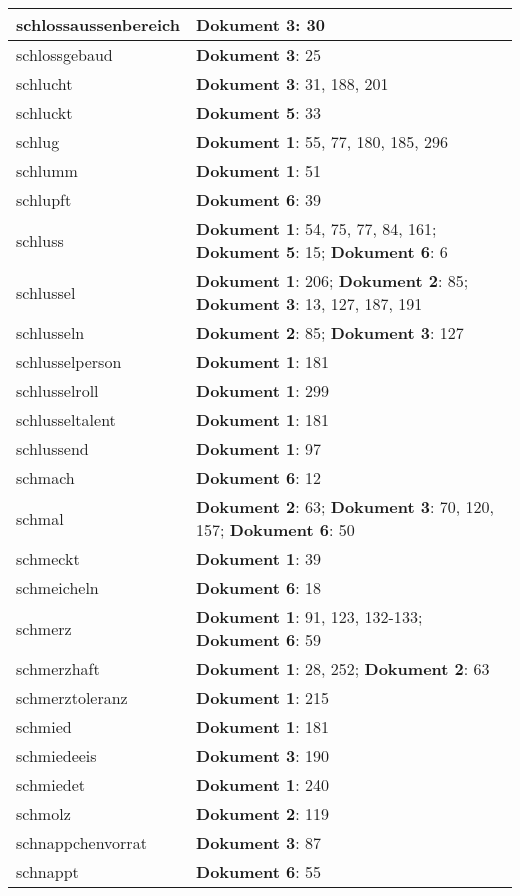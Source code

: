 \documentclass[a5paper]{article}
\begin{document}
\begin{longtable}[l]{|l|p{3in}|}
\hline
schlossaussenbereich & \textbf{Dokument 3}: 30 \\
\hline
schlossgebaud & \textbf{Dokument 3}: 25 \\
\hline
schlucht & \textbf{Dokument 3}: 31, 188, 201 \\
\hline
schluckt & \textbf{Dokument 5}: 33 \\
\hline
schlug & \textbf{Dokument 1}: 55, 77, 180, 185, 296 \\
\hline
schlumm & \textbf{Dokument 1}: 51 \\
\hline
schlupft & \textbf{Dokument 6}: 39 \\
\hline
schluss & \textbf{Dokument 1}: 54, 75, 77, 84, 161; \textbf{Dokument 5}: 15; \textbf{Dokument 6}: 6 \\
\hline
schlussel & \textbf{Dokument 1}: 206; \textbf{Dokument 2}: 85; \textbf{Dokument 3}: 13, 127, 187, 191 \\
\hline
schlusseln & \textbf{Dokument 2}: 85; \textbf{Dokument 3}: 127 \\
\hline
schlusselperson & \textbf{Dokument 1}: 181 \\
\hline
schlusselroll & \textbf{Dokument 1}: 299 \\
\hline
schlusseltalent & \textbf{Dokument 1}: 181 \\
\hline
schlussend & \textbf{Dokument 1}: 97 \\
\hline
schmach & \textbf{Dokument 6}: 12 \\
\hline
schmal & \textbf{Dokument 2}: 63; \textbf{Dokument 3}: 70, 120, 157; \textbf{Dokument 6}: 50 \\
\hline
schmeckt & \textbf{Dokument 1}: 39 \\
\hline
schmeicheln & \textbf{Dokument 6}: 18 \\
\hline
schmerz & \textbf{Dokument 1}: 91, 123, 132-133; \textbf{Dokument 6}: 59 \\
\hline
schmerzhaft & \textbf{Dokument 1}: 28, 252; \textbf{Dokument 2}: 63 \\
\hline
schmerztoleranz & \textbf{Dokument 1}: 215 \\
\hline
schmied & \textbf{Dokument 1}: 181 \\
\hline
schmiedeeis & \textbf{Dokument 3}: 190 \\
\hline
schmiedet & \textbf{Dokument 1}: 240 \\
\hline
schmolz & \textbf{Dokument 2}: 119 \\
\hline
schnappchenvorrat & \textbf{Dokument 3}: 87 \\
\hline
schnappt & \textbf{Dokument 6}: 55 \\

\end{longtable}
\end{document}

